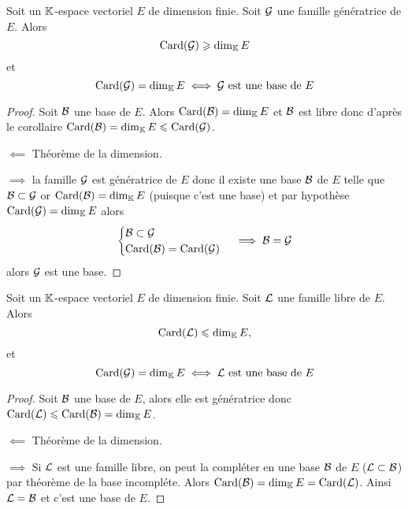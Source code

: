\begin{theo}
  Soit un $\K$-espace vectoriel $E$ de dimension finie. Soit $\G$ une famille génératrice de $E$. Alors
  \begin{equation}
    \Card(\G) \geqslant \Dim_\K E
  \end{equation}
et
\begin{equation}
  \Card(\G)=\Dim_\K E \iff \G \text{~est une base de } E
\end{equation}
\end{theo}
\begin{proof}
  Soit $\B$ une base de $E$. Alors $\Card(\B)=\Dim_\K E$ et $\B$ est libre donc d'après le corollaire $\Card(\B) = \Dim_\K E \leqslant \Card(\G)$.

  $\impliedby$ Théorème de la dimension.

  $\implies$ la famille $\G$ est génératrice de $E$ donc il existe une base $\B$ de $E$ telle que $\B \subset \G$ or $\Card(\B) = \Dim_\K E$ (puisque c'est une base) et par hypothèse $\Card(\G) = \Dim_\K E$ alors
  \begin{equation}
    \begin{cases} \B \subset \G \\ \Card(\B) = \Card(\G) \end{cases} \implies \B=\G
  \end{equation}
  alors $\G$ est une base.
\end{proof}

\begin{theo}
  Soit un $\K$-espace vectoriel $E$ de dimension finie. Soit $\Lb$ une famille libre de $E$. Alors
  \begin{equation}
    \Card(\Lb) \leqslant \Dim_\K E,
  \end{equation}
  et
  \begin{equation}
    \Card(\G)=\Dim_\K E \iff \Lb \text{~est une base de } E
  \end{equation}
\end{theo}
\begin{proof}
  Soit $\B$ une base de $E$, alors elle est génératrice donc $\Card(\Lb) \leqslant \Card(\B)=\Dim_\K E$.

  $\impliedby$ Théorème de la dimension.
  
  $\implies$ Si $\Lb$ est une famille libre, on peut la compléter en une base $\B$ de $E$ ($\Lb \subset \B$) par théorème de la base incompléte. Alors $\Card(\B)=\Dim_\K E = \Card(\Lb)$. Ainsi $\Lb=\B$ et c'est une base de $E$.
\end{proof}

